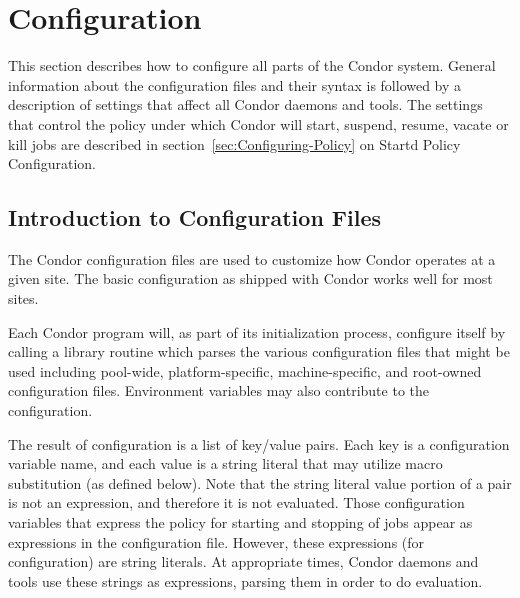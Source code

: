 \section{\label{sec:Configuring-Condor}Configuration}


This section describes how to configure all parts of the Condor
system.  General information about the configuration
files and their syntax is followed by a description of
settings that affect all
Condor daemons and tools.
The 
settings that control the policy under which Condor will start,
suspend, resume, vacate or kill jobs
are described in 
section~\ref{sec:Configuring-Policy} on Startd Policy Configuration. 

\subsection{\label{sec:Intro-to-Config-Files}Introduction to
Configuration Files} 

The Condor configuration files are used to customize how Condor
operates at a given site.  The basic configuration as shipped with
Condor works well for most sites.

Each Condor program will, as part of its initialization process,
configure itself by calling a library routine which parses the
various configuration files that might be used including pool-wide,
platform-specific, machine-specific, and root-owned configuration files.
Environment variables may also contribute to the configuration.

The result of configuration is a list of key/value pairs.
Each key is a configuration variable name,
and each value is a string literal
that may utilize macro substitution (as defined below).
Note that the string literal value portion of a pair is not an expression,
and therefore it is not evaluated.
Those configuration variables that express the policy for
starting and stopping of jobs appear as expressions in the
configuration file.
However, these expressions (for configuration) are string literals.
At appropriate times,
Condor daemons and tools use these strings as expressions,
parsing them in order to do evaluation.


